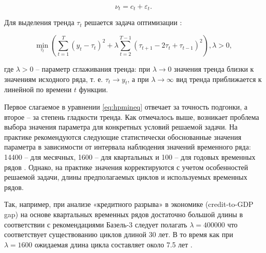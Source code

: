 \documentclass[a4paper,14pt]{extreport}
\begin{document}
	\begin{equation}
	\label{eq:decomp2}
	\nu_t = c_t + \varepsilon_t .
	\end{equation}
	
	Для выделения тренда $\tau_t$ решается задача оптимизации \cite{hp_orig_paper}: 
	
	
	
	\begin{equation}	
	{
		\min_{ \tau_t }{
			( 
			\sum_{t=1}^{T} (y_t-\tau_t)^2 + 
			\lambda \sum_{t=2}^{T-1} (\tau_{t+1} - 2\tau_t + \tau_{t-1})^2
			)
		}, 
		\lambda > 0, \label{eq:hpmineq}
	}
	\end{equation}
	
	где $\lambda > 0$ – параметр сглаживания тренда: при $\lambda \rightarrow 0$ значения тренда близки к значениям исходного ряда, т. е. $\tau_t \rightarrow y_t$, а при $\lambda \rightarrow \infty$ вид тренда приближается к линейной по времени $t$ функции.
	
	Первое слагаемое в уравнении \ref{eq:hpmineq} отвечает за точность подгонки, а второе – за степень гладкости тренда. Как отмечалось выше, возникает проблема выбора значения параметра   для конкретных условий решаемой задачи. На практике рекомендуются следующие статистически обоснованные значения параметра   в зависимости от интервала наблюдения значений временного ряда: 14400 – для месячных, 1600 – для квартальных и 100 – для годовых временных рядов \cite{hp_orig_paper}. Однако, на практике значения   корректируются с учетом особенностей решаемой задачи, длины предполагаемых циклов и используемых временных рядов. 
	
	Так, например, при анализе «кредитного разрыва» в экономике (credit-to-GDP gap) на основе квартальных временных рядов достаточно большой длины в соответствии с рекомендациями Базель-3 следует полагать $\lambda = 400000$  что соответствует существованию циклов длиной 30 лет.  В то время как при $\lambda = 1600$ ожидаемая длина цикла составляет около 7.5 лет \cite{schuler_detrend}.
	
\end{document}
